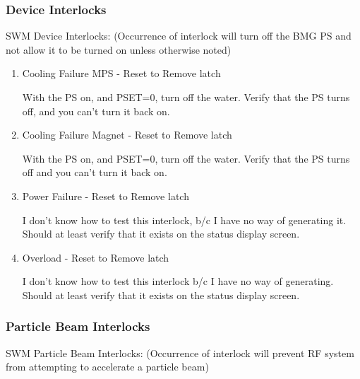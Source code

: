 \documentclass[11pt]{book}		%
\begin{document}
\subsubsection{Device Interlocks}

SWM Device Interlocks:
(Occurrence of interlock will turn off the BMG PS and not allow it to be turned on unless otherwise noted)

\begin{enumerate}
 \item Cooling Failure MPS - Reset to Remove latch

\color{red}
With the PS on, and PSET=0, turn off the water. Verify that the PS turns off, and you can't turn it back on.
\color{black}

 \item Cooling Failure Magnet - Reset to Remove latch

\color{red}
With the PS on, and PSET=0, turn off the water. Verify that the PS turns off and you can't turn it back on.
\color{black}

 \item Power Failure - Reset to Remove latch

\color{red}
I don't know how to test this interlock, b/c I have no way of generating it. Should at least verify that it exists on the status display screen.
\color{black}

\item Overload - Reset to Remove latch

\color{red}
I don't know how to test this interlock b/c I have no way of generating. Should at least verify that it exists on the status display screen.
\color{black}

\end{enumerate}

\subsubsection{Particle Beam Interlocks}

SWM Particle Beam Interlocks:
(Occurrence of interlock will prevent RF system from attempting to accelerate a particle beam)
\end{document}
